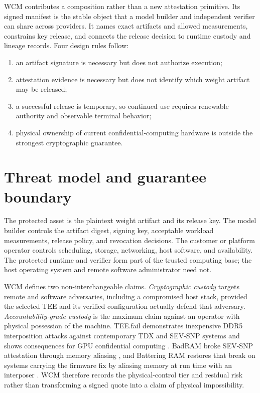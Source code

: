 \documentclass[10pt,letterpaper]{article}
\begin{document}
WCM contributes a composition rather than a new attestation primitive. Its signed manifest is the stable object that a model builder and independent verifier can share across providers. It names exact artifacts and allowed measurements, constrains key release, and connects the release decision to runtime custody and lineage records. Four design rules follow:

\begin{enumerate}[leftmargin=*]
  \item an artifact signature is necessary but does not authorize execution;
  \item attestation evidence is necessary but does not identify which weight artifact may be released;
  \item a successful release is temporary, so continued use requires renewable authority and observable terminal behavior;
  \item physical ownership of current confidential-computing hardware is outside the strongest cryptographic guarantee.
\end{enumerate}

\section{Threat model and guarantee boundary}

The protected asset is the plaintext weight artifact and its release key. The model builder controls the artifact digest, signing key, acceptable workload measurements, release policy, and revocation decisions. The customer or platform operator controls scheduling, storage, networking, host software, and availability. The protected runtime and verifier form part of the trusted computing base; the host operating system and remote software administrator need not.

WCM defines two non-interchangeable claims. \emph{Cryptographic custody} targets remote and software adversaries, including a compromised host stack, provided the selected TEE and its verified configuration actually defend that adversary. \emph{Accountability-grade custody} is the maximum claim against an operator with physical possession of the machine. TEE.fail demonstrates inexpensive DDR5 interposition attacks against contemporary TDX and SEV-SNP systems and shows consequences for GPU confidential computing \citep{teefail}. BadRAM broke SEV-SNP attestation through memory aliasing \citep{badram}, and Battering RAM restores that break on systems carrying the firmware fix by aliasing memory at run time with an interposer \citep{batteringram}. WCM therefore records the physical-control tier and residual risk rather than transforming a signed quote into a claim of physical impossibility.
\end{document}

